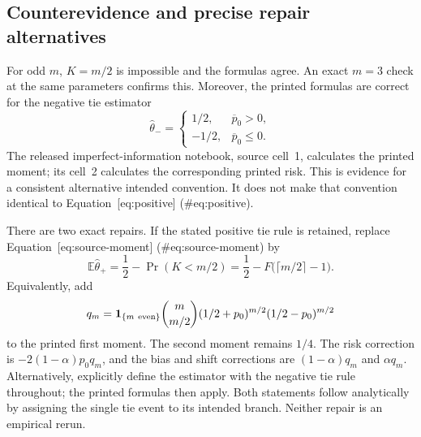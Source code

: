 \documentclass[10pt]{article}
\begin{document}
\subsection*{Counterevidence and precise repair alternatives}
For odd \(m\), \(K=m/2\) is impossible and the formulas agree. An exact \(m=3\) check at the same parameters confirms this. Moreover, the printed formulas are correct for the negative tie estimator \[\widehat\theta_-=
 \begin{cases}1/2,&\overline p_0>0,\\-1/2,&\overline p_0\leq0.\end{cases}\] The released imperfect-information notebook, source cell 1, calculates the printed moment; its cell 2 calculates the corresponding printed risk. This is evidence for a consistent alternative intended convention. It does not make that convention identical to Equation [eq:positive] (\#eq:positive).\par
There are two exact repairs. If the stated positive tie rule is retained, replace Equation [eq:source-moment] (\#eq:source-moment) by \[\mathbb E\widehat\theta_+
 =\frac12-\Pr(K<m/2)
 =\frac12-F\bigl(\lceil m/2\rceil-1\bigr).\] Equivalently, add \[q_m=\mathbf1_{\{m\ {\rm even}\}}
 \binom{m}{m/2}(1/2+p_0)^{m/2}(1/2-p_0)^{m/2}\] to the printed first moment. The second moment remains \(1/4\). The risk correction is \(-2(1-\alpha)p_0q_m\), and the bias and shift corrections are \((1-\alpha)q_m\) and \(\alpha q_m\). Alternatively, explicitly define the estimator with the negative tie rule throughout; the printed formulas then apply. Both statements follow analytically by assigning the single tie event to its intended branch. Neither repair is an empirical rerun.\par
\end{document}
